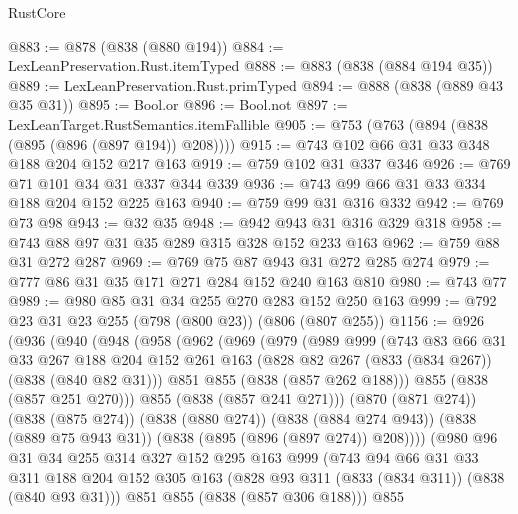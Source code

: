 \begin{lexlean}{RustCore}
\begin{coremodule}
@883 := @878 (@838 (@880 @194))
@884 := LexLeanPreservation.Rust.itemTyped
@888 := @883 (@838 (@884 @194 @35))
@889 := LexLeanPreservation.Rust.primTyped
@894 := @888 (@838 (@889 @43 @35 @31))
@895 := Bool.or
@896 := Bool.not
@897 := LexLeanTarget.RustSemantics.itemFallible
@905 := @753 (@763 (@894 (@838 (@895 (@896 (@897 @194)) @208))))
@915 := @743 @102 @66 @31 @33 @348 @188 @204 @152 @217 @163
@919 := @759 @102 @31 @337 @346
@926 := @769 @71 @101 @34 @31 @337 @344 @339
@936 := @743 @99 @66 @31 @33 @334 @188 @204 @152 @225 @163
@940 := @759 @99 @31 @316 @332
@942 := @769 @73 @98
@943 := @32 @35
@948 := @942 @943 @31 @316 @329 @318
@958 := @743 @88 @97 @31 @35 @289 @315 @328 @152 @233 @163
@962 := @759 @88 @31 @272 @287
@969 := @769 @75 @87 @943 @31 @272 @285 @274
@979 := @777 @86 @31 @35 @171 @271 @284 @152 @240 @163 @810
@980 := @743 @77
@989 := @980 @85 @31 @34 @255 @270 @283 @152 @250 @163
@999 := @792 @23 @31 @23 @255 (@798 (@800 @23)) (@806 (@807 @255))
@1156 := @926
    (@936
      (@940
        (@948
          (@958
            (@962
              (@969
                (@979
                  (@989
                    @999
                    (@743
                      @83
                      @66
                      @31
                      @33
                      @267
                      @188
                      @204
                      @152
                      @261
                      @163
                      (@828 @82 @267 (@833 (@834 @267)) (@838 (@840 @82 @31)))
                      @851
                      @855
                      (@838 (@857 @262 @188)))
                    @855
                    (@838 (@857 @251 @270)))
                  @855
                  (@838 (@857 @241 @271)))
                (@870 (@871 @274))
                (@838 (@875 @274))
                (@838 (@880 @274))
                (@838 (@884 @274 @943))
                (@838 (@889 @75 @943 @31))
                (@838 (@895 (@896 (@897 @274)) @208))))
            (@980
              @96
              @31
              @34
              @255
              @314
              @327
              @152
              @295
              @163
              @999
              (@743
                @94
                @66
                @31
                @33
                @311
                @188
                @204
                @152
                @305
                @163
                (@828 @93 @311 (@833 (@834 @311)) (@838 (@840 @93 @31)))
                @851
                @855
                (@838 (@857 @306 @188)))
              @855

\end{coremodule}
\end{lexlean}
